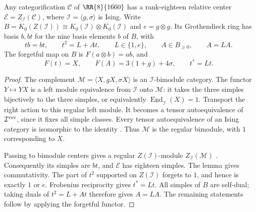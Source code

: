 \begin{proposition}\label{prop:1660-relative-center}
Any categorification $\mathcal C$ of $\RR{8}{1660}$ has a rank-eighteen
relative center $\mathcal E=Z_{\mathcal I}(\mathcal C)$, where
$\mathcal I=\langle g,\sigma\rangle$ is Ising. Write
$B=K_0(Z(\mathcal I))\cong K_0(\mathcal I)\otimes K_0(\mathcal I)$ and
$e=g\otimes g$. Its Grothendieck ring has basis $b,bt$ for the nine
basis elements $b$ of $B$, with
\[
 tb=bt,\qquad t^2=L+At,\qquad L\in\{1,e\},\qquad A\in B_{\ge0},
 \qquad A=LA.
\]
The forgetful map on $B$ is $F(a\otimes b)=ab$, and
\[
 F(t)=X,\qquad F(A)=3(1+g)+4\sigma,\qquad t^*=Lt.
\]
\end{proposition}
\begin{proof}
The complement $\mathcal M=\langle X,gX,\sigma X\rangle$ is an
$\mathcal I$-bimodule category. The functor $Y\mapsto YX$ is a left
module equivalence from $\mathcal I$ onto $\mathcal M$: it takes the
three simples bijectively to the three simples, or equivalently
$\underline{\operatorname{End}}_{\mathcal I}(X)=1$.
Transport the right action to this regular left module. It becomes a
tensor autoequivalence of $\mathcal I^{\rm rev}$, since it fixes all
simple classes. Every tensor autoequivalence of an Ising category is
isomorphic to the identity \cite[Remark B.6(i)]{DGNO}. Thus
$\mathcal M$ is the regular bimodule, with $1$ corresponding to $X$.

Passing to bimodule centers gives a regular $Z(\mathcal I)$-module
$Z_{\mathcal I}(\mathcal M)$ \cite[Definition 2.1 and Remark 2.2]{GNNrel}.
Consequently its simples are $bt$, and $\mathcal E$ has eighteen
simples. The lemma gives commutativity. The part of $t^2$ supported on
$Z(\mathcal I)$ forgets to $1$, and hence is exactly $1$ or $e$.
Frobenius reciprocity gives $t^*=Lt$. All simples of $B$ are self-dual;
taking duals of $t^2=L+At$ therefore gives $A=LA$. The remaining
statements follow by applying the forgetful functor.
\end{proof}

